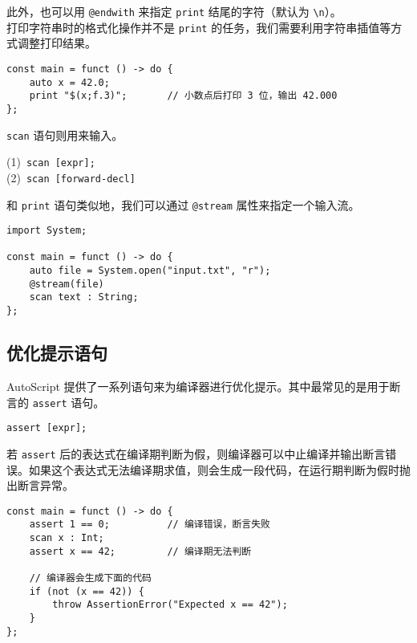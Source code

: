 此外，也可以用 \lstinline!@endwith! 来指定 \lstinline!print! 结尾的字符（默认为 \lstinline!\n!）。 \\

打印字符串时的格式化操作并不是 \lstinline!print! 的任务，我们需要利用字符串插值等方式调整打印结果。

\begin{lstlisting}
const main = funct () -> do {
    auto x = 42.0;
    print "$(x;f.3)";		// 小数点后打印 3 位，输出 42.000
};
\end{lstlisting}

\lstinline!scan! 语句则用来输入。

\begin{grammar} \label{grm:scan-statement}
    (1)\ \lstinline!scan [expr];! \\
    (2)\ \lstinline!scan [forward-decl]!
\end{grammar}

和 \lstinline!print! 语句类似地，我们可以通过 \lstinline!@stream! 属性来指定一个输入流。

\begin{lstlisting}
import System;

const main = funct () -> do {
    auto file = System.open("input.txt", "r");
    @stream(file)
    scan text : String;
};
\end{lstlisting}

\subsection{优化提示语句}

AutoScript 提供了一系列语句来为编译器进行优化提示。其中最常见的是用于断言的 \lstinline!assert! 语句。

\begin{grammar} \label{grm:assert-statement}
    \lstinline!assert [expr];! 
\end{grammar}

若 \lstinline!assert! 后的表达式在编译期判断为假，则编译器可以中止编译并输出断言错误。如果这个表达式无法编译期求值，则会生成一段代码，在运行期判断为假时抛出断言异常。

\begin{lstlisting}
const main = funct () -> do {
    assert 1 == 0;          // 编译错误，断言失败
    scan x : Int;
    assert x == 42;         // 编译期无法判断

    // 编译器会生成下面的代码
    if (not (x == 42)) {
        throw AssertionError("Expected x == 42");
    }
};
\end{lstlisting}

